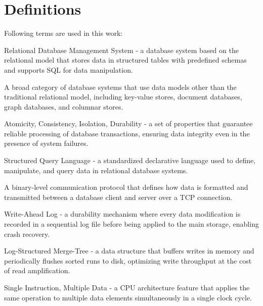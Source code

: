 \chapter{Definitions}

Following terms are used in this work:\par\bigskip

\begin{description}[style=multiline, labelwidth=5cm, leftmargin=5.5cm]

  \item[RDBMS]
       Relational Database Management System - a database system based on the relational model that stores data in structured tables with predefined schemas and supports SQL for data manipulation.

  \item[NoSQL]
       A broad category of database systems that use data models other than the traditional relational model, including key-value stores, document databases, graph databases, and columnar stores.

  \item[ACID]
       Atomicity, Consistency, Isolation, Durability - a set of properties that guarantee reliable processing of database transactions, ensuring data integrity even in the presence of system failures.

  \item[SQL]
       Structured Query Language - a standardized declarative language used to define, manipulate, and query data in relational database systems.

  \item[Wire Protocol]
       A binary-level communication protocol that defines how data is formatted and transmitted between a database client and server over a TCP connection.

  \item[WAL]
       Write-Ahead Log - a durability mechanism where every data modification is recorded in a sequential log file before being applied to the main storage, enabling crash recovery.

  \item[LSM-Tree]
       Log-Structured Merge-Tree - a data structure that buffers writes in memory and periodically flushes sorted runs to disk, optimizing write throughput at the cost of read amplification.

  \item[SIMD]
       Single Instruction, Multiple Data - a CPU architecture feature that applies the same operation to multiple data elements simultaneously in a single clock cycle.


\end{description}
